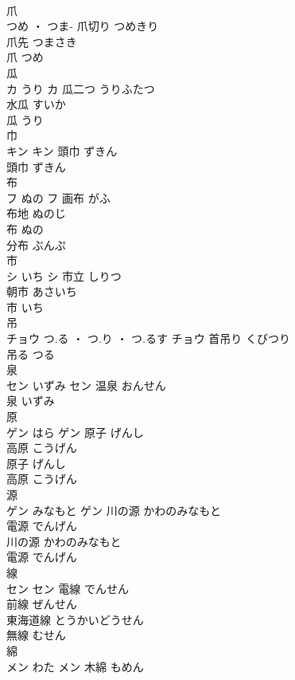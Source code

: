 \documentclass[8pt]{extreport}
\begin{document}
\begin{CJK}{UTF8}{min}
\\	爪	
\\	つめ ・ つま-		爪切り	つめきり	
\\	爪先	つまさき	
\\	爪	つめ	
\\	瓜	
\\	カ	うり	カ	瓜二つ	うりふたつ	
\\	水瓜	すいか	
\\	瓜	うり	
\\	巾	
\\	キン		キン	頭巾	ずきん	
\\	頭巾	ずきん	
\\	布	
\\	フ	ぬの	フ	画布	がふ	
\\	布地	ぬのじ	
\\	布	ぬの	
\\	分布	ぶんぷ	
\\	市	
\\	シ	いち	シ	市立	しりつ	
\\	朝市	あさいち	
\\	市	いち	
\\	吊	
\\	チョウ	つ.る ・ つ.り ・ つ.るす	チョウ													首吊り	くびつり	
\\	吊る	つる	
\\	泉	
\\	セン	いずみ	セン	温泉	おんせん	
\\	泉	いずみ	
\\	原	
\\	ゲン	はら	ゲン	原子	げんし	
\\	高原	こうげん	
\\	原子	げんし	
\\	高原	こうげん	
\\	源	
\\	ゲン	みなもと	ゲン	川の源	かわのみなもと	
\\	電源	でんげん	
\\	川の源	かわのみなもと	
\\	電源	でんげん	
\\	線	
\\	セン		セン	電線	でんせん	
\\	前線	ぜんせん	
\\	東海道線	とうかいどうせん	
\\	無線	むせん	
\\	綿	
\\	メン	わた	メン	木綿	もめん	

\end{CJK}
\end{document}
